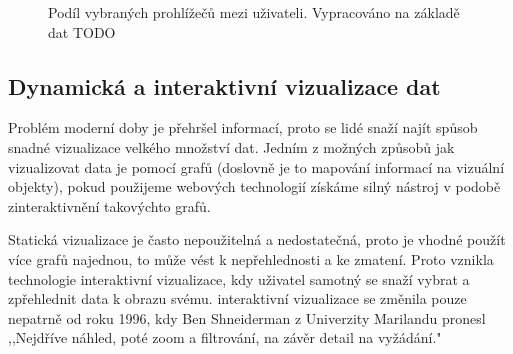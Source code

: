 \begin{figure}[H]
\centering
  \caption{Podíl vybraných prohlížečů mezi uživateli. Vypracováno na základě dat TODO}
  \label{browser-share}
\end{figure}
\subsection{Dynamická a interaktivní vizualizace dat}
\par Problém moderní doby je přehršel informací, proto se lidé snaží najít spůsob snadné vizualizace velkého množství dat. Jedním z možných způsobů jak vizualizovat data je pomocí grafů (doslovně je to mapování informací na vizuální objekty), pokud použijeme webových technologií získáme silný nástroj v podobě zinteraktivnění takovýchto grafů. \cite{interactive-data-reily}

\par Statická vizualizace je často nepoužitelná a nedostatečná, proto je vhodné použít více grafů najednou, to může vést k nepřehlednosti a ke zmatení. Proto vznikla technologie interaktivní vizualizace, kdy uživatel samotný se snaží vybrat a zpřehlednit data k obrazu svému. interaktivní vizualizace se změnila pouze nepatrně od roku 1996, kdy Ben Shneiderman z Univerzity Marilandu pronesl ,,Nejdříve náhled, poté zoom a filtrování, na závěr detail na vyžádání."\cite{interactive-data-reily}

